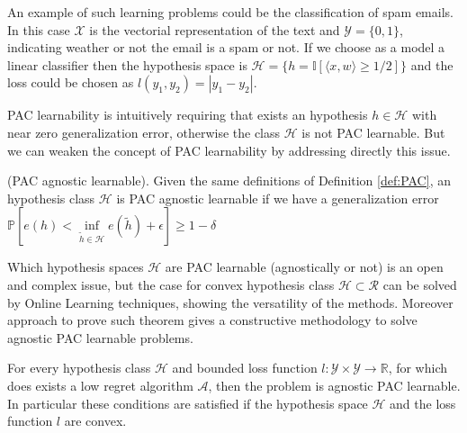 An example of such learning problems could be the classification of spam emails. In this case $\mathcal X$ is the vectorial representation of the text and $\mathcal Y=\{0,1\}$, indicating weather or not the email is a spam or not. If we choose as a model a linear classifier then the hypothesis space is $\mathcal H=\{h = \mathbb I[\langle x,w\rangle \ge 1/2]\}$ and the loss could be chosen as $l(y_1,y_2)=|y_1-y_2|$.

PAC learnability is intuitively requiring that exists an hypothesis $h\in\mathcal H$ with near zero generalization error, otherwise the class $\mathcal H$ is not PAC learnable.
But we can weaken the concept of PAC learnability by addressing directly this issue.

\begin{definition}(PAC agnostic learnable).
    Given the same definitions of Definition \ref{def:PAC}, an hypothesis class $\mathcal H$ is PAC agnostic learnable if we have a generalization error $\mathbb P[e(h)<\inf\limits_{\tilde h\in\mathcal H}e(\tilde h)+\epsilon]\ge1-\delta$
\end{definition}

Which hypothesis spaces $\mathcal H$ are PAC learnable (agnostically or not) is an open and complex issue, but the case for convex hypothesis class $\mathcal H\subset\mathcal R$ can be solved by Online Learning techniques, showing the versatility of the methods. 
Moreover approach to prove such theorem gives a constructive methodology to solve agnostic PAC learnable problems.

\begin{theorem}
For every hypothesis class $\mathcal H$ and bounded loss function $l:\mathcal Y\times\mathcal Y\to \mathbb R$, for which does exists a low regret algorithm $\mathcal A$, then the problem is agnostic PAC learnable. In particular these conditions are satisfied if the hypothesis space $\mathcal H$ and the loss function $l$ are convex.
\end{theorem}

